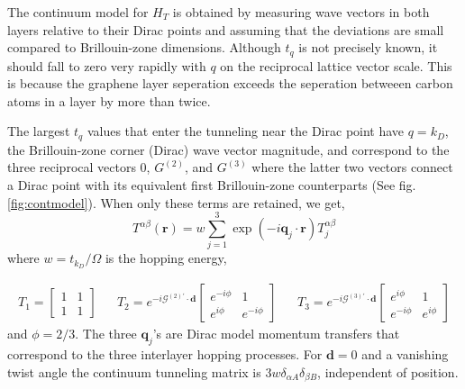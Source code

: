 The continuum model for $H_T$ is obtained by measuring wave vectors in both layers relative to their Dirac points and assuming that the deviations are small compared to Brillouin-zone dimensions. Although $t_q$ is not precisely known, it should fall to zero very rapidly with $q$ on the reciprocal lattice vector scale. This is because the graphene layer seperation exceeds the seperation betweeen carbon atoms in a layer by more than twice.

The largest $t_q$ values that enter the tunneling near the Dirac point have $q=k_D$, the Brillouin-zone corner (Dirac) wave vector magnitude, and correspond to the three reciprocal vectors 0, $G^{(2)}$, and $G^{(3)}$ where the latter two vectors connect a Dirac point with its equivalent first Brillouin-zone counterparts (See fig. \ref{fig:contmodel}). When only these terms are retained, we get,
\begin{equation}
T^{\alpha \beta}(\mathbf{r})=w \sum_{j=1}^{3} \exp \left(-i \mathbf{q}_{j} \cdot \mathbf{r}\right) T_{j}^{\alpha \beta}
\end{equation}
where $w=t_{k_D}/\Omega$ is the hopping energy,

\begin{align}
	T_1 = \begin{bmatrix}
		1 & 1 \\
		1 & 1
	\end{bmatrix} &&
	T_2=e^{-i \mathscr{G}^{(2)\prime} \cdot \mathbf{d}} \begin{bmatrix}
		e^{-i \phi} & 1 \\ e^{i \phi} & e^{-i \phi}
	\end{bmatrix} &&
	T_3=e^{-i \mathscr{G}^{(3)\prime} \cdot \mathbf{d}} \begin{bmatrix}
		e^{i \phi} & 1 \\ e^{-i \phi} & e^{i \phi}
	\end{bmatrix}
\end{align}
and $\phi=2/3$. The three $\mathbf{q}_j$’s are Dirac model momentum transfers that correspond to the three interlayer hopping processes. For $\mathbf{d}=0$ and a vanishing twist angle the continuum tunneling matrix is $3w\delta_{\alpha A}\delta_{\beta B}$, independent of position.

